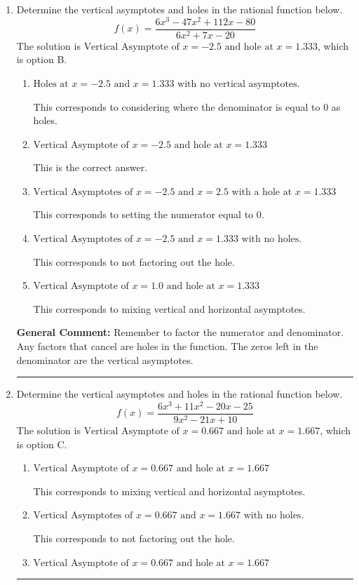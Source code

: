 \documentclass{extbook}[14pt]
\newcommand{\litem}[1]{\item #1

\rule{\textwidth}{0.4pt}}
\begin{document}
\begin{enumerate}\litem{
Determine the vertical asymptotes and holes in the rational function below.
\[ f(x) = \frac{6x^{3} -47 x^{2} +112 x -80}{6x^{2} +7 x -20} \]The solution is \( \text{Vertical Asymptote of } x = -2.5 \text{ and hole at } x = 1.333 \), which is option B.\begin{enumerate}[label=\Alph*.]
\item \( \text{Holes at } x = -2.5 \text{ and } x = 1.333 \text{ with no vertical asymptotes.} \)

This corresponds to considering where the denominator is equal to 0 as holes.
\item \( \text{Vertical Asymptote of } x = -2.5 \text{ and hole at } x = 1.333 \)

This is the correct answer.
\item \( \text{Vertical Asymptotes of } x = -2.5 \text{ and } x = 2.5 \text{ with a hole at } x = 1.333 \)

This corresponds to setting the numerator equal to 0.
\item \( \text{Vertical Asymptotes of } x = -2.5 \text{ and } x = 1.333 \text{ with no holes.} \)

This corresponds to not factoring out the hole.
\item \( \text{Vertical Asymptote of } x = 1.0 \text{ and hole at } x = 1.333 \)

This corresponds to mixing vertical and horizontal asymptotes.
\end{enumerate}

\textbf{General Comment:} Remember to factor the numerator and denominator. Any factors that cancel are holes in the function. The zeros left in the denominator are the vertical asymptotes.
}
\litem{
Determine the vertical asymptotes and holes in the rational function below.
\[ f(x) = \frac{6x^{3} +11 x^{2} -20 x -25}{9x^{2} -21 x + 10} \]The solution is \( \text{Vertical Asymptote of } x = 0.667 \text{ and hole at } x = 1.667 \), which is option C.\begin{enumerate}[label=\Alph*.]
\item \( \text{Vertical Asymptote of } x = 0.667 \text{ and hole at } x = 1.667 \)

This corresponds to mixing vertical and horizontal asymptotes.
\item \( \text{Vertical Asymptotes of } x = 0.667 \text{ and } x = 1.667 \text{ with no holes.} \)

This corresponds to not factoring out the hole.
\item \( \text{Vertical Asymptote of } x = 0.667 \text{ and hole at } x = 1.667 \)


\end{enumerate}}
\end{enumerate}
\end{document}
